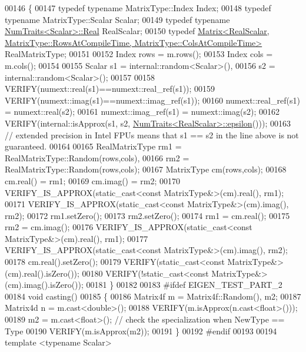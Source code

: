 \begin{DoxyCode}
00146 \{
00147   \textcolor{keyword}{typedef} \textcolor{keyword}{typename} MatrixType::Index Index;
00148   \textcolor{keyword}{typedef} \textcolor{keyword}{typename} MatrixType::Scalar Scalar;
00149   \textcolor{keyword}{typedef} \textcolor{keyword}{typename} \hyperlink{group___core___module_struct_eigen_1_1_num_traits}{NumTraits<Scalar>::Real} RealScalar;
00150   \textcolor{keyword}{typedef} 
      \hyperlink{group___core___module_class_eigen_1_1_matrix}{Matrix<RealScalar, MatrixType::RowsAtCompileTime, MatrixType::ColsAtCompileTime>}
       RealMatrixType;
00151 
00152   Index rows = m.rows();
00153   Index cols = m.cols();
00154 
00155   Scalar s1 = internal::random<Scalar>(),
00156          s2 = internal::random<Scalar>();
00157 
00158   VERIFY(numext::real(s1)==numext::real\_ref(s1));
00159   VERIFY(numext::imag(s1)==numext::imag\_ref(s1));
00160   numext::real\_ref(s1) = numext::real(s2);
00161   numext::imag\_ref(s1) = numext::imag(s2);
00162   VERIFY(internal::isApprox(s1, s2, \hyperlink{group___core___module_struct_eigen_1_1_num_traits}{NumTraits<RealScalar>::epsilon}()));
00163   \textcolor{comment}{// extended precision in Intel FPUs means that s1 == s2 in the line above is not guaranteed.}
00164 
00165   RealMatrixType rm1 = RealMatrixType::Random(rows,cols),
00166                  rm2 = RealMatrixType::Random(rows,cols);
00167   MatrixType cm(rows,cols);
00168   cm.real() = rm1;
00169   cm.imag() = rm2;
00170   VERIFY\_IS\_APPROX(static\_cast<const MatrixType&>(cm).real(), rm1);
00171   VERIFY\_IS\_APPROX(static\_cast<const MatrixType&>(cm).imag(), rm2);
00172   rm1.setZero();
00173   rm2.setZero();
00174   rm1 = cm.real();
00175   rm2 = cm.imag();
00176   VERIFY\_IS\_APPROX(static\_cast<const MatrixType&>(cm).real(), rm1);
00177   VERIFY\_IS\_APPROX(static\_cast<const MatrixType&>(cm).imag(), rm2);
00178   cm.real().setZero();
00179   VERIFY(static\_cast<const MatrixType&>(cm).real().isZero());
00180   VERIFY(!static\_cast<const MatrixType&>(cm).imag().isZero());
00181 \}
00182 
00183 \textcolor{preprocessor}{#ifdef EIGEN\_TEST\_PART\_2}
00184 \textcolor{keywordtype}{void} casting()
00185 \{
00186   Matrix4f m = Matrix4f::Random(), m2;
00187   Matrix4d n = m.cast<\textcolor{keywordtype}{double}>();
00188   VERIFY(m.isApprox(n.cast<\textcolor{keywordtype}{float}>()));
00189   m2 = m.cast<\textcolor{keywordtype}{float}>(); \textcolor{comment}{// check the specialization when NewType == Type}
00190   VERIFY(m.isApprox(m2));
00191 \}
00192 \textcolor{preprocessor}{#endif}
00193 
00194 \textcolor{keyword}{template} <\textcolor{keyword}{typename} Scalar>

\end{DoxyCode}
